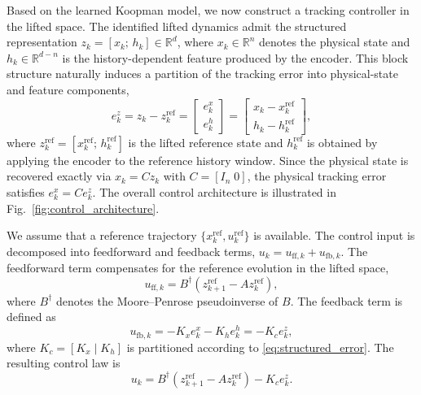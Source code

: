 \documentclass[journal]{IEEEtran}
\begin{document}
Based on the learned Koopman model, we now construct a tracking controller in the lifted space. The identified lifted dynamics admit the structured representation $z_k = [x_k;\, h_k] \in \mathbb{R}^d$, where $x_k \in \mathbb{R}^n$ denotes the physical state and $h_k \in \mathbb{R}^{d-n}$ is the history-dependent feature produced by the encoder. This block structure naturally induces a partition of the tracking error into physical-state and feature components,
\begin{equation}
    e_k^z = z_k - z_k^{\mathrm{ref}}
    = \begin{bmatrix} e_k^x \\ e_k^h \end{bmatrix}
    = \begin{bmatrix} x_k - x_k^{\mathrm{ref}} \\ h_k - h_k^{\mathrm{ref}} \end{bmatrix},
    \label{eq:structured_error}
\end{equation}
where $z_k^{\mathrm{ref}} = [x_k^{\mathrm{ref}};\, h_k^{\mathrm{ref}}]$ is the lifted reference state and $h_k^{\mathrm{ref}}$ is obtained by applying the encoder to the reference history window. Since the physical state is recovered exactly via $x_k = C z_k$ with $C = [I_n\;0]$, the physical tracking error satisfies $e_k^x = C e_k^z$. The overall control architecture is illustrated in Fig.~\ref{fig:control_architecture}.

We assume that a reference trajectory $\{x_k^{\mathrm{ref}}, u_k^{\mathrm{ref}}\}$ is available. The control input is decomposed into feedforward and feedback terms, $u_k = u_{\mathrm{ff},k} + u_{\mathrm{fb},k}$. The feedforward term compensates for the reference evolution in the lifted space,
\begin{equation}
    u_{\mathrm{ff},k} = B^\dagger\!\left(z_{k+1}^{\mathrm{ref}} - A z_k^{\mathrm{ref}}\right),
    \label{eq:feedforward}
\end{equation}
where $B^\dagger$ denotes the Moore--Penrose pseudoinverse of $B$. The feedback term is defined as
\begin{equation}
    u_{\mathrm{fb},k} = -K_x e_k^x - K_h e_k^h = -K_c e_k^z,
    \label{eq:hierarchical_fb}
\end{equation}
where $K_c = [K_x\;|\;K_h]$ is partitioned according to \eqref{eq:structured_error}. The resulting control law is
\begin{equation}
    u_k = B^\dagger\!\left(z_{k+1}^{\mathrm{ref}} - A z_k^{\mathrm{ref}}\right) - K_c e_k^z.
    \label{eq:full_ctrl}
\end{equation}
\end{document}
